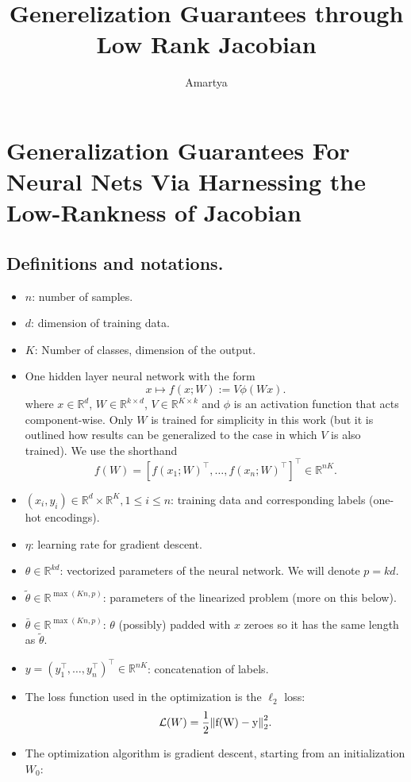 \documentclass[a4paper]{article}
\title{Generelization Guarantees through Low Rank  Jacobian}
\author{Amartya}
\date{}
\newcommand{\R}{\mathbb{R}}
\begin{document}
\maketitle


\section{Generalization Guarantees For Neural Nets Via Harnessing the Low-Rankness of Jacobian}


\subsection*{Definitions and notations.}
\begin{itemize}
\item $n$: number of samples.
\item $d$: dimension of training data.
\item $K$: Number of classes, dimension of the output.
\item One hidden layer neural network with the form
    \[
    x \mapsto f(x ; W):= V \phi(W x).
    \] 
    where $x\in\R^d$, $W\in \R^{k\times d}$, $V\in \R^{K\times k}$ and $\phi$ is an activation function that acts component-wise. Only $W$ is trained for simplicity in this work (but it is outlined how results can be generalized to the case in which $V$ is also trained). We use the shorthand
    \[
        f(W) = [f(x_1;W)^\top, \dots, f(x_n;W)^\top]^\top \in \R^{nK}.
    \] 
\item $(x_i, y_i) \in \R^d\times\R^K, 1\leq i\leq n$: training data and corresponding labels (one-hot encodings). 
\item $\eta$: learning rate for gradient descent.
\item $\theta \in \R^{kd}$: vectorized parameters of the neural network. We will denote $p=kd$.
\item $\tilde{\theta} \in \R^{\max(Kn,p)}$: parameters of the linearized problem (more on this below).
\item $\bar{\theta} \in \R^{\max(Kn,p)}$: $\theta$ (possibly) padded with $x$ zeroes so it has the same length as $\tilde{\theta}$.
\item $y = (y_1^\top,\dots, y_n^\top)^\top \in \R^{nK}$: concatenation of labels.
\item The loss function used in the optimization is the $\ell_2$ loss:
    \[
        \mathcal{L}(W) = \frac{1}{2} \mathrm{\left\lVert f(W)-y\right\rVert}_2^2.
    \] 
\item The optimization algorithm is gradient descent, starting from an initialization $W_0$:

\end{itemize}
\end{document}
